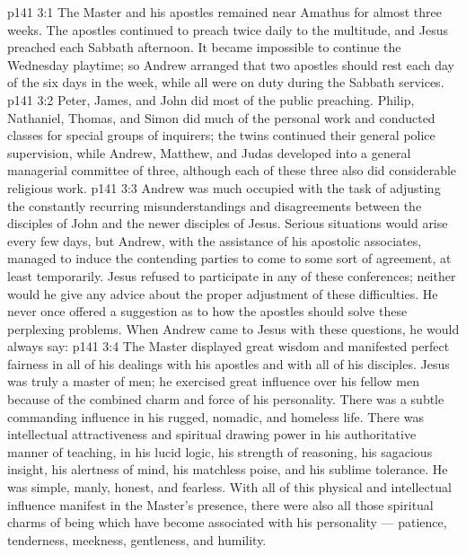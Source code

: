 \vs p141 3:1 The Master and his apostles remained near Amathus for almost three weeks. The apostles continued to preach twice daily to the multitude, and Jesus preached each Sabbath afternoon. It became impossible to continue the Wednesday playtime; so Andrew arranged that two apostles should rest each day of the six days in the week, while all were on duty during the Sabbath services.
\vs p141 3:2 Peter, James, and John did most of the public preaching. Philip, Nathaniel, Thomas, and Simon did much of the personal work and conducted classes for special groups of inquirers; the twins continued their general police supervision, while Andrew, Matthew, and Judas developed into a general managerial committee of three, although each of these three also did considerable religious work.
\vs p141 3:3 Andrew was much occupied with the task of adjusting the constantly recurring misunderstandings and disagreements between the disciples of John and the newer disciples of Jesus. Serious situations would arise every few days, but Andrew, with the assistance of his apostolic associates, managed to induce the contending parties to come to some sort of agreement, at least temporarily. Jesus refused to participate in any of these conferences; neither would he give any advice about the proper adjustment of these difficulties. He never once offered a suggestion as to how the apostles should solve these perplexing problems. When Andrew came to Jesus with these questions, he would always say: 
\vs p141 3:4 \pc The Master displayed great wisdom and manifested perfect fairness in all of his dealings with his apostles and with all of his disciples. Jesus was truly a master of men; he exercised great influence over his fellow men because of the combined charm and force of his personality. There was a subtle commanding influence in his rugged, nomadic, and homeless life. There was intellectual attractiveness and spiritual drawing power in his authoritative manner of teaching, in his lucid logic, his strength of reasoning, his sagacious insight, his alertness of mind, his matchless poise, and his sublime tolerance. He was simple, manly, honest, and fearless. With all of this physical and intellectual influence manifest in the Master’s presence, there were also all those spiritual charms of being which have become associated with his personality --- patience, tenderness, meekness, gentleness, and humility.
